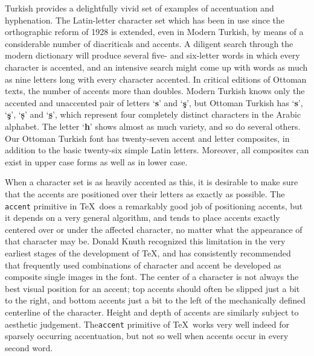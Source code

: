 Turkish provides a delightfully vivid set of examples of accentuation
and hyphenation.  The Latin-letter character set which has been in
use since the orthographic reform of 1928 is extended, even in Modern
Turkish, by means of a considerable number of diacriticals and accents.  A
diligent search through the modern dictionary will produce several
five- and six-letter words in which every character is accented, and an
intensive search might come up with words as much as nine letters long
with every character accented.  In critical editions of Ottoman texts,
the number of accents more than doubles.  Modern Turkish knows only
the accented and unaccented pair of letters `{\bf s}' and `{\bf\c s}', but
Ottoman Turkish has `{\bf s}', `{\bf\c s}', `{\bf\d s}' and `{\bf\b s}', which
represent four completely distinct characters in the Arabic alphabet.
The letter `{\bf h}' shows almost as much variety, and so do several
others.  Our Ottoman Turkish font has twenty-seven accent and letter
composites, in addition to the basic twenty-six simple Latin letters.
Moreover, all composites can exist in upper case forms as well as in
lower case.

When a character set is as heavily accented as this, it is desirable
to make sure that the accents are positioned over their letters as
exactly as possible.  The {\tt\bs accent} primitive in \TeX\ does a
remarkably good job of positioning accents, but it depends on a very
general algorithm, and tends to place accents exactly centered over
or under the affected character, no matter what the appearance of
that character may be.  Donald Knuth recognized this limitation in
the very earliest stages of the development of \TeX, and has
consistently recommended that frequently used combinations of
character and accent be developed as composite single images in the
font.  The center of a character is not always the best visual
position for an accent; top accents should often be slipped just a
bit to the right, and bottom accents just a bit to the left of the
mechanically defined centerline of the character.  Height and depth
of accents are similarly subject to aesthetic judgement.  
The{\tt\bs accent} primitive of \TeX\ works very well indeed for
sparsely occurring accentuation, but not so well when accents occur
in every second word.

